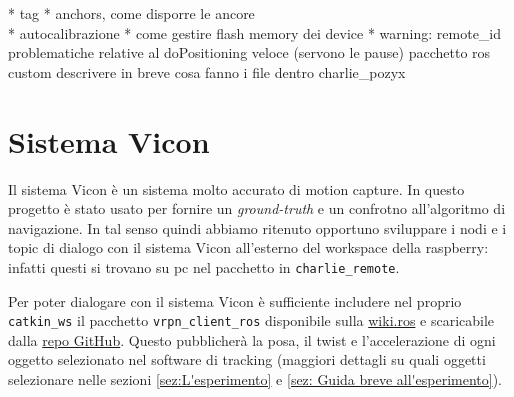 * tag
* anchors, come disporre le ancore \\
* autocalibrazione
* come gestire flash memory dei device
* warning: remote\_id 
		problematiche relative al doPositioning veloce (servono le pause)
		pacchetto ros custom descrivere in breve cosa fanno i file dentro charlie\_pozyx

\section{Sistema Vicon}
\label{sez:Sistema Vicon}

Il sistema Vicon \`e un sistema molto accurato di motion capture. 
In questo progetto \`e stato usato per fornire un \textit{ground-truth} e un confrotno all'algoritmo di navigazione. 
In tal senso quindi abbiamo ritenuto opportuno sviluppare i nodi e i topic di dialogo con il sistema Vicon all'esterno del workspace della raspberry: infatti questi si trovano su pc nel pacchetto in \texttt{charlie\_remote}.

Per poter dialogare con il sistema Vicon \`e sufficiente includere nel proprio \texttt{catkin\_ws} il pacchetto \texttt{vrpn\_client\_ros} disponibile sulla \href{https://wiki.ros.org/vrpn_client_ros}{wiki.ros} e scaricabile dalla \href{https://github.com/ros-drivers/vrpn_client_ros}{repo GitHub}.
Questo pubblicher\`a la posa, il twist e l'accelerazione di ogni oggetto selezionato nel software di tracking (maggiori dettagli su quali oggetti selezionare nelle sezioni \ref{sez:L'esperimento} e \ref{sez: Guida breve all'esperimento}).

